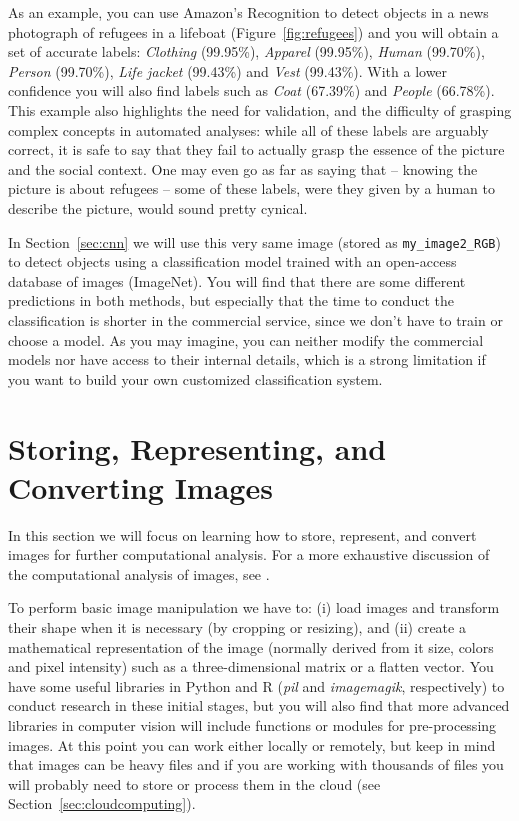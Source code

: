 As an example, you can use Amazon's Recognition to detect objects in a news photograph of refugees in a lifeboat (Figure~\ref{fig:refugees}) and you will obtain a set of accurate labels: \textit{Clothing} (99.95\%), \textit{Apparel} (99.95\%), \textit{Human} (99.70\%), \textit{Person} (99.70\%), \textit{Life jacket} (99.43\%) and \textit{Vest} (99.43\%). With a lower confidence you will also find labels such as \textit{Coat} (67.39\%) and \textit{People} (66.78\%). This example also highlights the need for validation, and the difficulty of grasping complex concepts in automated analyses: while all of these labels are arguably correct, it is safe to say that they fail to actually grasp the essence of the picture and the social context. One may even go as far as saying that -- knowing the picture is about refugees -- some of these labels, were they given by a human to describe the picture, would sound pretty cynical.

In Section~\ref{sec:cnn} we will use this very same image (stored as \texttt{my\_image2\_RGB}) to detect objects using a classification model trained with an open-access database of images (ImageNet). You will find that there are some different predictions in both methods, but especially that the time to conduct the classification is shorter in the commercial service, since we don't have to train or choose a model. As you may imagine, you can  neither modify the commercial models nor have access to their internal details, which is a strong limitation if you want to build your own customized classification system.


%


\section{Storing, Representing, and Converting Images}
\label{sec:storing}

In this section we will focus on learning how to store, represent, and convert images for further computational analysis. For a more exhaustive discussion of the computational analysis of images, see \citet{williams2020images}.

To perform basic image manipulation we have to: (i) load images and transform their shape when it is necessary (by cropping or resizing), and (ii) create a mathematical representation of the image (normally derived from it size, colors and pixel intensity) such as a three-dimensional matrix or a flatten vector. You have some useful libraries in Python and R (\emph{pil} and \emph{imagemagik}, respectively) to conduct research in these initial stages, but you will also find that more advanced libraries in computer vision will include functions or modules for pre-processing images. At this point you can work either locally or remotely, but keep in mind that images can be heavy files and if you are working with thousands of files you will probably need to store or process them in the cloud (see Section~\ref{sec:cloudcomputing}).

